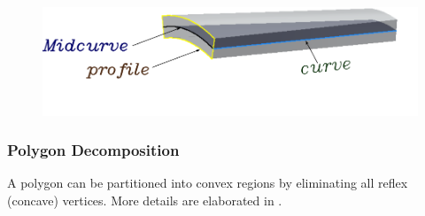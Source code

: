 \begin{figure}[h]
\centering \includegraphics[scale=0.4]{../Common/images//MidsurfSmallProfile_1.pdf} 
\label{figure_MidsurfSmallProfile}
\end{figure}

\vspace{-2.1cm}

\subsubsection{Polygon Decomposition}
A polygon can be partitioned into convex regions by eliminating all reflex (concave) vertices. More details are elaborated in  \cite{YogeshETES2014} \cite{YogeshIJCAET2017}.
%
%
%
%
